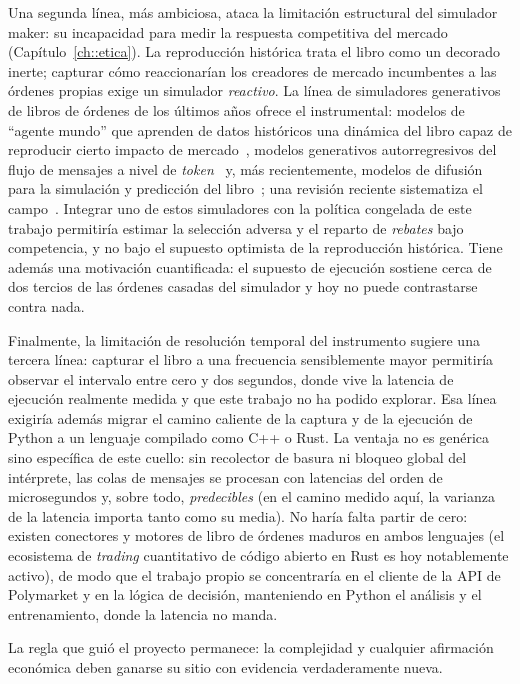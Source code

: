 Una segunda línea, más ambiciosa, ataca la limitación estructural del simulador maker: su
incapacidad para medir la respuesta competitiva del mercado (Capítulo~\ref{ch::etica}). La
reproducción histórica trata el libro como un decorado inerte; capturar cómo reaccionarían
los creadores de mercado incumbentes a las órdenes propias exige un simulador
\emph{reactivo}. La línea de simuladores generativos de libros de órdenes de los últimos
años ofrece el instrumental: modelos de ``agente mundo'' que aprenden de datos históricos una
dinámica del libro capaz de reproducir cierto impacto de
mercado~\cite{coletta2022worldagent}, modelos generativos autorregresivos del flujo de
mensajes a nivel de \emph{token}~\cite{nagy2023generative} y, más recientemente, modelos de
difusión para la simulación y predicción del libro~\cite{backhouse2025diffusion}; una
revisión reciente sistematiza el campo~\cite{jain2024lobreview}. Integrar uno de estos
simuladores con la política congelada de este trabajo permitiría estimar la selección
adversa y el reparto de \emph{rebates} bajo competencia, y no bajo el supuesto optimista de
la reproducción histórica. Tiene además una motivación cuantificada: el supuesto de
ejecución sostiene cerca de dos tercios de las órdenes casadas del simulador y hoy no puede
contrastarse contra nada.

Finalmente, la limitación de resolución temporal del instrumento sugiere una tercera línea:
capturar el libro a una frecuencia sensiblemente mayor permitiría observar el intervalo
entre cero y dos segundos, donde vive la latencia de ejecución realmente medida y que este
trabajo no ha podido explorar. Esa línea exigiría además migrar el camino caliente de la
captura y de la ejecución de Python a un lenguaje compilado como C++ o Rust. La ventaja no
es genérica sino específica de este cuello: sin recolector de basura ni bloqueo global del
intérprete, las colas de mensajes se procesan con latencias del orden de microsegundos y,
sobre todo, \emph{predecibles} (en el camino medido aquí, la varianza de la latencia
importa tanto como su media). No haría falta partir de cero: existen conectores y motores
de libro de órdenes maduros en ambos lenguajes (el ecosistema de \emph{trading}
cuantitativo de código abierto en Rust es hoy notablemente activo), de modo que el trabajo
propio se concentraría en el cliente de la API de Polymarket y en la lógica de decisión,
manteniendo en Python el análisis y el entrenamiento, donde la latencia no manda.

La regla que guió el proyecto permanece: la complejidad y cualquier afirmación económica
deben ganarse su sitio con evidencia verdaderamente nueva.
